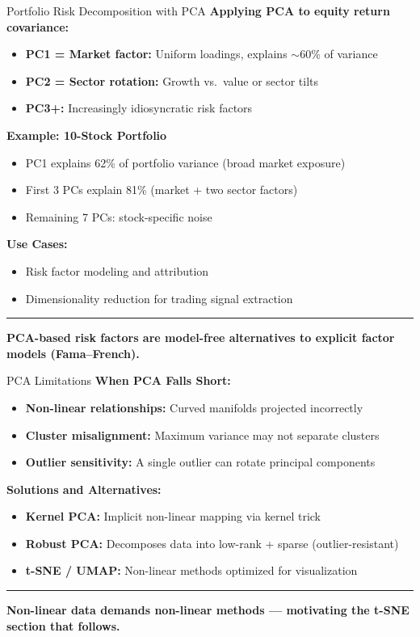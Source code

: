 \documentclass[8pt,aspectratio=169]{beamer}
\newcommand{\bottomnote}[1]{%
\vfill
\vspace{-2mm}
\textcolor{mllavender2}{\rule{\textwidth}{0.4pt}}
\vspace{1mm}
\footnotesize
\textbf{#1}
}
\begin{document}
\begin{frame}[t]{Portfolio Risk Decomposition with PCA}
\textbf{Applying PCA to equity return covariance:}
\begin{itemize}
  \item \textbf{PC1 = Market factor:} Uniform loadings, explains $\sim$60\% of variance
  \item \textbf{PC2 = Sector rotation:} Growth vs.\ value or sector tilts
  \item \textbf{PC3+:} Increasingly idiosyncratic risk factors
\end{itemize}

\vspace{0.3em}
\textbf{Example: 10-Stock Portfolio}
\begin{itemize}
  \item PC1 explains 62\% of portfolio variance (broad market exposure)
  \item First 3 PCs explain 81\% (market + two sector factors)
  \item Remaining 7 PCs: stock-specific noise
\end{itemize}

\vspace{0.3em}
\textbf{Use Cases:}
\begin{itemize}
  \item Risk factor modeling and attribution
  \item Dimensionality reduction for trading signal extraction
\end{itemize}
\bottomnote{PCA-based risk factors are model-free alternatives to explicit factor models (Fama--French).}
\end{frame}

\begin{frame}[t]{PCA Limitations}
\textbf{When PCA Falls Short:}
\begin{itemize}
  \item \textbf{Non-linear relationships:} Curved manifolds projected incorrectly
  \item \textbf{Cluster misalignment:} Maximum variance may not separate clusters
  \item \textbf{Outlier sensitivity:} A single outlier can rotate principal components
\end{itemize}

\vspace{0.5em}
\textbf{Solutions and Alternatives:}
\begin{itemize}
  \item \textbf{Kernel PCA:} Implicit non-linear mapping via kernel trick
  \item \textbf{Robust PCA:} Decomposes data into low-rank + sparse (outlier-resistant)
  \item \textbf{t-SNE / UMAP:} Non-linear methods optimized for visualization
\end{itemize}

\bottomnote{Non-linear data demands non-linear methods --- motivating the t-SNE section that follows.}
\end{frame}
\end{document}
